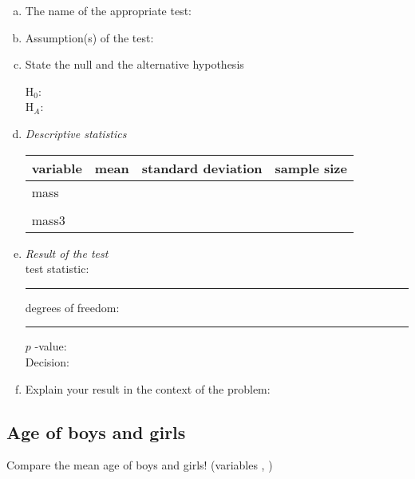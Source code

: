  
 \begin{enumerate}[a)]
 			\item The name of the appropriate test:	
				\hrulefill 
				
			\item
					Assumption(s) of the test: \hrulefill
				
				\hrulefill
			\item		
			State the null and the alternative hypothesis
			
			H$_0$: 	\hrulefill 	\\
			H$_A$: \hrulefill 	
			\item \emph{Descriptive statistics}
			
			
				\begin{large}
					\begin{center}
						\begin{tabular}{l||l|l|l}
						\toprule
						variable		& mean	& standard deviation & sample size\\
						\midrule
						mass		&&&\\
									&&&\\
						mass3	&&&\\
						\bottomrule
						\end{tabular}
					\end{center}						
				\end{large}

			\item \emph{Result of the test}
				\\
				
				test statistic: \rule{30mm}{.4pt}	degrees of freedom:  \rule{30mm}{.4pt}	$p$ -value: \hrulefill
				\\

					Decision: 	\hrulefill
		
			\item Explain your result in the context of the problem:
			
			 \hrulefill

\end{enumerate}




 \subsection{Age of boys and girls}
Compare the mean age of boys and girls! (variables , )
 
